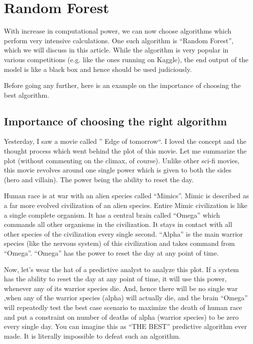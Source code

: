 \documentclass[a4paper,12pt]{article}
\begin{document}
\section*{Random Forest}
With increase in computational power, we can now choose algorithms which perform very intensive calculations. One such algorithm is “Random Forest”, which we will discuss in this article. While the algorithm is very popular in various competitions (e.g. like the ones running on Kaggle), the end output of the model is like a black box and hence should be used judiciously.

Before going any further, here is an example on the importance of choosing the best algorithm.



\subsection*{Importance of choosing the right algorithm}
Yesterday, I saw a movie called ” Edge of tomorrow“.  I loved the concept and the thought process which went behind the plot of this movie. Let me summarize the plot (without commenting on the climax, of course). Unlike other sci-fi movies, this movie revolves around one single power which is given to both the sides (hero and villain). The power being the ability to reset the day.

Human race is at war with an alien species called “Mimics”.  Mimic is described as a far more evolved civilization of an alien species. Entire Mimic civilization is like a single complete organism. It has a central brain called “Omega” which commands all other organisms in the civilization. It stays in contact with all other species of the civilization every single second. “Alpha” is the main warrior species (like the nervous system) of this civilization and takes command from “Omega”. “Omega” has the power to reset the day at any point of time.

Now, let’s wear the hat of a predictive analyst to analyze this plot. If a system has the ability to reset the day at any point of time, it will use this power, whenever any of its warrior species die. And, hence there will be no single war ,when any of the warrior species (alpha) will actually die, and the brain “Omega” will repeatedly test the best case scenario to maximize the death of human race and put a constraint on number of deaths of alpha (warrior species) to be zero every single day. You can imagine this as “THE BEST” predictive algorithm ever made. It is literally impossible to defeat such an algorithm.
\end{document}
